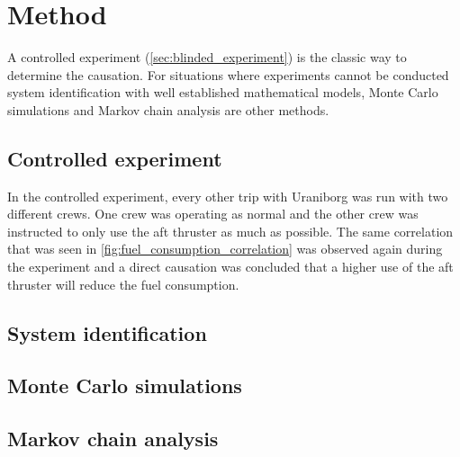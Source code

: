 \documentclass[fleqn,10pt]{olplainarticle}
\begin{document}
\section{Method}
A controlled experiment (\autoref{sec:blinded_experiment}) is the classic way to determine the causation. For situations where experiments cannot be conducted system identification with well established
mathematical models, Monte Carlo simulations and Markov chain analysis are other methods.

\subsection{Controlled experiment}\label{sec:blinded_experiment}
In the controlled experiment, every other trip with Uraniborg was run with two different crews. One crew was operating as normal and the other crew was instructed to only use the aft thruster as much as possible. The same correlation that was seen in \autoref{fig:fuel_consumption_correlation} was observed again during the experiment and a direct causation was concluded that a higher use of the aft thruster will reduce the fuel consumption.

\subsection{System identification}
\subsection{Monte Carlo simulations}
\subsection{Markov chain analysis}




\end{document}
